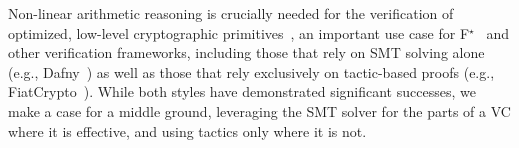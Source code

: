 \documentclass[runningheads]{llncs}
\newcommand\fstar{F$^\star$\xspace}
\newcommand{\comm}[3]{\ifcheckpagebudget\else\ifdraft{{\color{#1}[#2: #3]}}\fi\fi}
\newcommand{\guido}[1]{\comm{blue}{Guido}{#1}}
\begin{document}


Non-linear arithmetic reasoning is crucially needed for the
verification of optimized, low-level cryptographic
primitives~\cite{vale,haclstar}, an important use case
for \fstar~\cite{everest} and other verification frameworks, including
those that rely on SMT solving alone (e.g., Dafny~\cite{leino10dafny})
as well as those that rely exclusively on tactic-based proofs (e.g.,
FiatCrypto~\cite{fiat-crypto}).
%
While both styles have demonstrated significant successes, we make
a case for a middle ground, leveraging the SMT solver for
the parts of a VC where it is effective,
and using tactics only where it is not.




\end{document}
